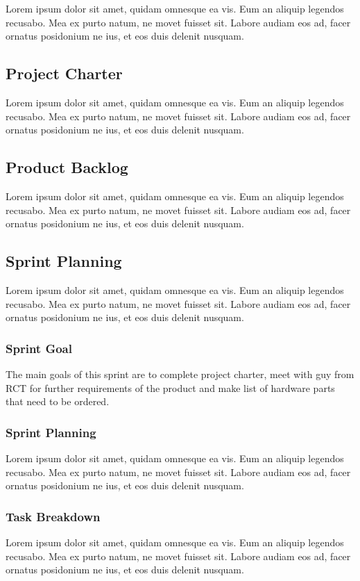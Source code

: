 Lorem ipsum dolor sit amet, quidam omnesque ea vis. Eum an aliquip legendos recusabo. Mea ex purto natum, ne movet fuisset sit. Labore audiam eos ad, facer ornatus posidonium ne ius, et eos duis delenit nusquam.

\subsection{Project Charter}
Lorem ipsum dolor sit amet, quidam omnesque ea vis. Eum an aliquip legendos recusabo. Mea ex purto natum, ne movet fuisset sit. Labore audiam eos ad, facer ornatus posidonium ne ius, et eos duis delenit nusquam.

\subsection{Product Backlog}
Lorem ipsum dolor sit amet, quidam omnesque ea vis. Eum an aliquip legendos recusabo. Mea ex purto natum, ne movet fuisset sit. Labore audiam eos ad, facer ornatus posidonium ne ius, et eos duis delenit nusquam.

\subsection{Sprint Planning}
Lorem ipsum dolor sit amet, quidam omnesque ea vis. Eum an aliquip legendos recusabo. Mea ex purto natum, ne movet fuisset sit. Labore audiam eos ad, facer ornatus posidonium ne ius, et eos duis delenit nusquam.

\subsubsection{Sprint Goal}
The main goals of this sprint are to complete project charter, meet with guy from RCT for further requirements of the product and make list of hardware parts that need to be ordered.


\subsubsection{Sprint Planning}
Lorem ipsum dolor sit amet, quidam omnesque ea vis. Eum an aliquip legendos recusabo. Mea ex purto natum, ne movet fuisset sit. Labore audiam eos ad, facer ornatus posidonium ne ius, et eos duis delenit nusquam.

\subsubsection{Task Breakdown}
Lorem ipsum dolor sit amet, quidam omnesque ea vis. Eum an aliquip legendos recusabo. Mea ex purto natum, ne movet fuisset sit. Labore audiam eos ad, facer ornatus posidonium ne ius, et eos duis delenit nusquam.

